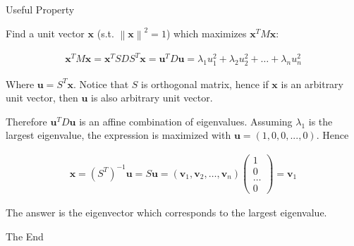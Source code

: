 \documentclass[8pt]{beamer}
\newcommand{\norm}[1]{\left\lVert#1\right\rVert}
\begin{document}
\begin{frame}{Useful Property}

Find a unit vector $\mathbf{x}$ (s.t. $\norm{\mathbf{x}}^2 = 1$) which maximizes $\mathbf{x}^T M \mathbf{x}$:

\begin{align*}
    \mathbf{x}^T M \mathbf{x} = \mathbf{x}^T S D S^T \mathbf{x} = \mathbf{u}^T D \mathbf{u} = \lambda_1 u_1^2 + \lambda_2 u_2^2 + \dots + \lambda_n u_n^2
\end{align*}

Where $\mathbf{u} = S^T \mathbf{x}$. Notice that $S$ is orthogonal matrix, hence if $\mathbf{x}$ is an arbitrary unit vector, then $\mathbf{u}$ is also arbitrary unit vector.

Therefore $\mathbf{u}^T D \mathbf{u}$ is an affine combination of eigenvalues. Assuming $\lambda_1$ is the largest eigenvalue, the expression is maximized with $\mathbf{u} = (1, 0, 0, ..., 0)$. Hence

\begin{align*}
    \mathbf{x} = (S^T)^{-1} \mathbf{u} = S \mathbf{u} = (\mathbf{v}_1, \mathbf{v}_2, \dots, \mathbf{v}_n) \begin{pmatrix}
    1 \\
    0 \\
    \dots \\
    0
    \end{pmatrix} = \mathbf{v}_1
\end{align*}

The answer is the eigenvector which corresponds to the largest eigenvalue.

\end{frame}


\begin{frame}
\Huge{\centerline{The End}}
\end{frame}

\end{document}
